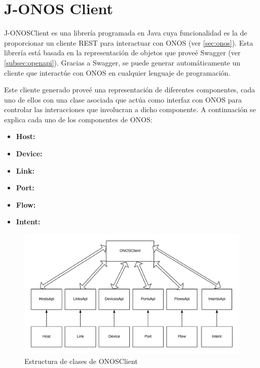 \section{J-ONOS Client}
\label{sec:onosclient}

J-ONOSClient es una librería programada en Java cuya funcionalidad es la de proporcionar un cliente \ac{REST} para interactuar con \ac{ONOS} (ver \ref{sec:onos}). Esta librería está basada en la representación de objetos que proveé Swagger (ver \ref{subsec:openapi}). Gracias a Swagger, se puede generar automáticamente un cliente que interactúe con \ac{ONOS} en cualquier lenguaje de programación.

Este cliente generado proveé una representación de diferentes componentes, cada uno de ellos con una clase asociada que actúa como interfaz con \ac{ONOS} para controlar las interacciones que involucran a dicho componente. A continuación se explica cada uno de los componentes de \ac{ONOS}:

\begin{itemize}
	
	\item \textbf{Host:} 
	
	\item \textbf{Device:}
	
	\item \textbf{Link:}
	
	\item \textbf{Port:}
	
	\item \textbf{Flow:}
	
	\item \textbf{Intent:}
	
\end{itemize}


\begin{figure}[!ht]
	\centering
	\includegraphics[width=1\linewidth]{imagenes/ONOSClient}
	\caption{Estructura de clases de ONOSClient}
	\label{fig:onosclient}
\end{figure}

